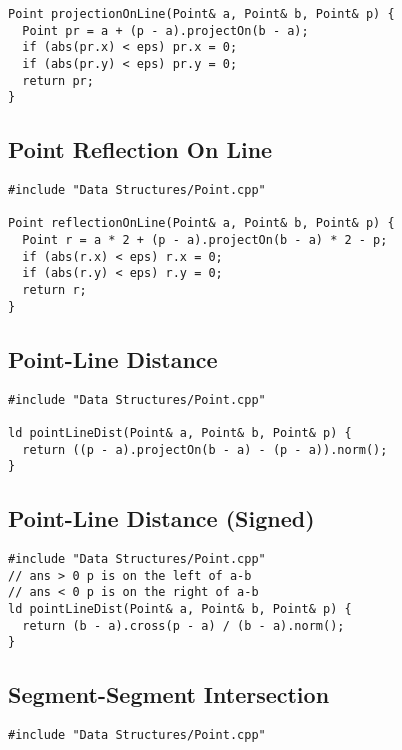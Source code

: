 \documentclass[twoside]{article}
\begin{document}
\begin{multicols*}{2}
\begin{verbatim}
Point projectionOnLine(Point& a, Point& b, Point& p) {
  Point pr = a + (p - a).projectOn(b - a);
  if (abs(pr.x) < eps) pr.x = 0;
  if (abs(pr.y) < eps) pr.y = 0;
  return pr;
}
\end{verbatim}

\subsectionfont{\large\bfseries\sffamily\underline}
\subsection*{Point Reflection On Line}
\begin{verbatim}
#include "Data Structures/Point.cpp"

Point reflectionOnLine(Point& a, Point& b, Point& p) {
  Point r = a * 2 + (p - a).projectOn(b - a) * 2 - p;
  if (abs(r.x) < eps) r.x = 0;
  if (abs(r.y) < eps) r.y = 0;
  return r;
}
\end{verbatim}

\subsectionfont{\large\bfseries\sffamily\underline}
\subsection*{Point-Line Distance}
\begin{verbatim}
#include "Data Structures/Point.cpp"

ld pointLineDist(Point& a, Point& b, Point& p) {
  return ((p - a).projectOn(b - a) - (p - a)).norm();
}
\end{verbatim}

\subsectionfont{\large\bfseries\sffamily\underline}
\subsection*{Point-Line Distance (Signed)}
\begin{verbatim}
#include "Data Structures/Point.cpp"
// ans > 0 p is on the left of a-b
// ans < 0 p is on the right of a-b
ld pointLineDist(Point& a, Point& b, Point& p) {
  return (b - a).cross(p - a) / (b - a).norm();
}
\end{verbatim}

\subsectionfont{\large\bfseries\sffamily\underline}
\subsection*{Segment-Segment Intersection}
\begin{verbatim}
#include "Data Structures/Point.cpp"


\end{verbatim}
\end{multicols*}
\end{document}
